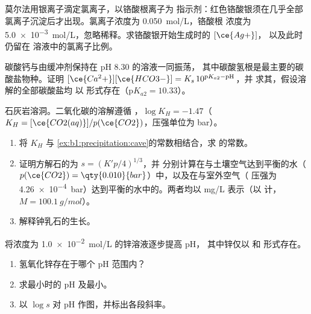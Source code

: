 \begin{exercise}[$\star\star$]\label{exo:b1:precipitation:8}
莫尔法用银离子滴定氯离子，以铬酸根离子为
指示剂：红色铬酸银须在几乎全部
氯离子沉淀后才出现。氯离子浓度为 \qty{0.050}{mol/L}，铬酸根
浓度为 \qty{5.0e-3}{mol/L}，忽略稀释。求铬酸银开始生成时的 $[\ce{Ag+}]$，
以及此时仍留在
溶液中的氯离子比例。
\end{exercise}

\begin{exercise}[$\star\star$]\label{exo:b1:precipitation:9}
碳酸钙与由缓冲剂保持在 pH 8.30 的溶液一同振荡，
其中碳酸氢根是最主要的碳酸盐物种。证明
$[\ce{Ca^2+}][\ce{HCO3-}] = K_s\,10^{\mathrm{p}K_{a2} - \mathrm{pH}}$，并
求其，假设溶解的全部碳酸盐均
以  形式存在（$\mathrm{p}K_{a2} = 10.33$）。
\end{exercise}

\begin{exercise}[$\star\star\star$]\label{exo:b1:precipitation:10}
石灰岩溶洞。二氧化碳的溶解遵循
，$\log K_H = -1.47$（$K_H =
[\ce{CO2(aq)}]/p(\ce{CO2})$，压强单位为 bar）。
\begin{enumerate}
  \item 将 $K_H$ 与
        \cref{ex:b1:precipitation:cave}的常数相结合，求
         的常数。
  \item 证明方解石的为 $s = (K'p/4)^{1/3}$，并
        分别计算在与土壤空气达到平衡的水（
        $p(\ce{CO2}) = \qty{0.010}{bar}$）中，以及在与室外空气（
        压强为 \qty{4.26e-4}{bar}）达到平衡的水中的。两者均以 \unit{mg/L} 表示（以  计，
        $M = \qty{100.1}{g/mol}$）。
  \item 解释钟乳石的生长。
\end{enumerate}
\end{exercise}

\begin{exercise}[$\star\star\star$]\label{exo:b1:precipitation:11}
将浓度为 \qty{1.0e-2}{mol/L} 的锌溶液逐步提高 pH，
其中锌仅以  和  形式存在。
\begin{enumerate}
  \item 氢氧化锌存在于哪个 pH 范围内？
  \item 求最小时的 pH 及最小。
  \item 以 $\log s$ 对 pH 作图，并标出各段斜率。
\end{enumerate}
\end{exercise}


